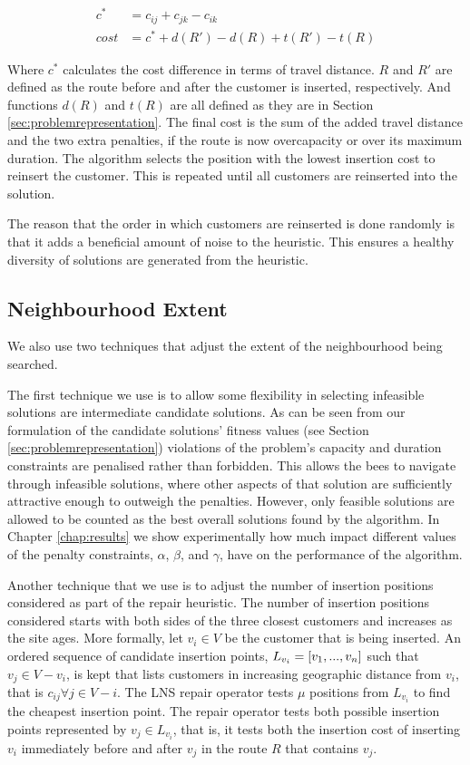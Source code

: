 \begin{align}
   c^*   &= c_{ij} + c_{jk} - c_{ik} \\
   cost  &= c^* + d(R') - d(R) + t(R') - t(R)
\end{align}

Where $c^*$ calculates the cost difference in terms of travel distance. $R$ and $R'$ are defined as the route before and after the customer is inserted, respectively. And functions $d(R)$ and $t(R)$ are all defined as they are in Section \ref{sec:problemrepresentation}. The final cost is the sum of the added travel distance and the two extra penalties, if the route is now overcapacity or over its maximum duration. The algorithm selects the position with the lowest insertion cost to reinsert the customer. This is repeated until all customers are reinserted into the solution. 

The reason that the order in which customers are reinserted is done randomly is that it adds a beneficial amount of noise to the heuristic. This ensures a healthy diversity of solutions are generated from the heuristic. 

\subsection{Neighbourhood Extent}
\label{subsec:neighborhoodscope}

We also use two techniques that adjust the extent of the neighbourhood being searched. 

The first technique we use is to allow some flexibility in selecting infeasible solutions are intermediate candidate solutions. As can be seen from our formulation of the candidate solutions' fitness values (see Section \ref{sec:problemrepresentation}) violations of the problem's capacity and duration constraints are penalised rather than forbidden. This allows the bees to navigate through infeasible solutions, where other aspects of that solution are sufficiently attractive enough to outweigh the penalties. However, only feasible solutions are allowed to be counted as the best overall solutions found by the algorithm. In Chapter \ref{chap:results} we show experimentally how much impact different values of the penalty constraints, $\alpha$, $\beta$, and $\gamma$, have on the performance of the algorithm.

Another technique that we use is to adjust the number of insertion positions considered as part of the repair heuristic. The number of insertion positions considered starts with both sides of the three closest customers and increases as the site ages. More formally, let $v_i \in V$ be the customer that is being inserted. An ordered sequence of candidate insertion points, $L_{v_i} = [v_1,...,v_n]$ such that $v_j \in V - v_i$, is kept that lists customers in increasing geographic distance from $v_i$, that is $c_{ij} \forall j \in V - i$. The LNS repair operator tests $\mu$ positions from $L_{v_i}$ to find the cheapest insertion point. The repair operator tests both possible insertion points represented by $v_j \in L_{v_i}$, that is, it tests both the insertion cost of inserting $v_i$ immediately before and after $v_j$ in the route $R$ that contains $v_j$. 

